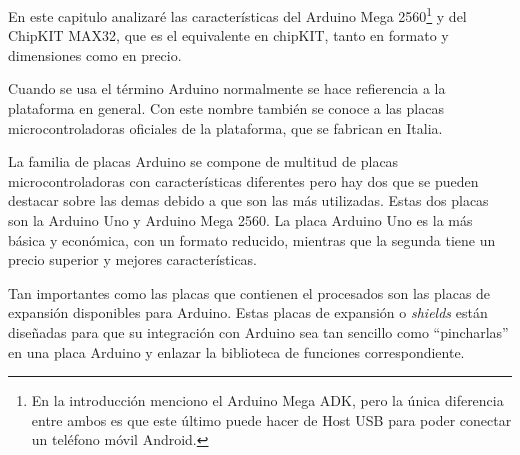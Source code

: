 



En este capitulo analizaré las características del Arduino Mega 2560\footnote{En la introducción menciono el Arduino Mega ADK, pero la única diferencia entre ambos es que este último puede hacer de Host USB para poder conectar un teléfono móvil Android.} y del ChipKIT MAX32, que es el equivalente en chipKIT, tanto en formato y dimensiones como en precio.


Cuando se usa el término Arduino normalmente se hace refierencia a la plataforma en general. Con este nombre también se conoce a las placas microcontroladoras oficiales de la plataforma, que se fabrican en Italia.

La familia de placas Arduino se compone de multitud de placas microcontroladoras con características diferentes pero hay dos que se pueden destacar sobre las demas debido a que son las más utilizadas.  Estas dos placas son la Arduino Uno y Arduino Mega 2560. La placa Arduino Uno es la más básica y económica, con un formato reducido, mientras que la segunda tiene un precio superior y mejores características.

Tan importantes como las placas que contienen el procesados son las placas de expansión disponibles para Arduino. Estas placas de expansión o \textit{shields} están diseñadas para que su integración con Arduino sea tan sencillo como \textquotedblleft pincharlas\textquotedblright{}  en una placa Arduino y enlazar la biblioteca de funciones correspondiente.

